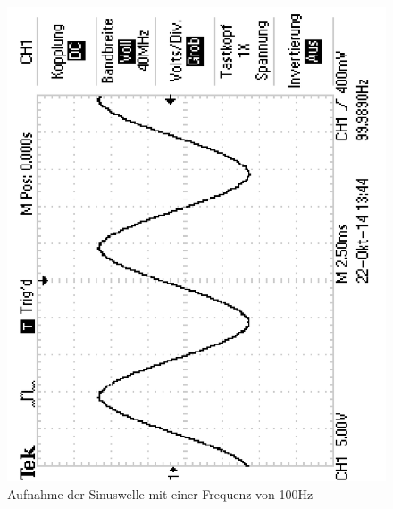\documentclass[12pt,a4paper]{article}
\begin{document}
\begin{figure}[H] 
  \centering
    \includegraphics[scale = 0.4, angle = -90]{2_1_sin_100hz.pdf}
  	\caption[Aufnahme der Sinuswelle mit einer Frequenz von 100Hz]{Aufnahme der Sinuswelle mit einer Frequenz von 100Hz}
  \label{fig:2_1_sin_100hz}
\end{figure}
\end{document}
